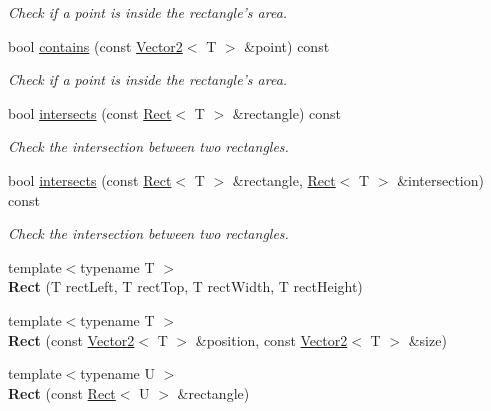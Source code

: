 \begin{DoxyCompactItemize}
\begin{DoxyCompactList}\small\item\em Check if a point is inside the rectangle's area. \end{DoxyCompactList}\item 
bool \hyperlink{classsf_1_1Rect_a24163acdb9b2987c0ea55c201e270d41}{contains} (const \hyperlink{classsf_1_1Vector2}{Vector2}$<$ T $>$ \&point) const 
\begin{DoxyCompactList}\small\item\em Check if a point is inside the rectangle's area. \end{DoxyCompactList}\item 
bool \hyperlink{classsf_1_1Rect_a566740c8f58e01bb052266f47e7e1011}{intersects} (const \hyperlink{classsf_1_1Rect}{Rect}$<$ T $>$ \&rectangle) const 
\begin{DoxyCompactList}\small\item\em Check the intersection between two rectangles. \end{DoxyCompactList}\item 
bool \hyperlink{classsf_1_1Rect_a5f1874792b04c7e221bb786b31f5836e}{intersects} (const \hyperlink{classsf_1_1Rect}{Rect}$<$ T $>$ \&rectangle, \hyperlink{classsf_1_1Rect}{Rect}$<$ T $>$ \&intersection) const 
\begin{DoxyCompactList}\small\item\em Check the intersection between two rectangles. \end{DoxyCompactList}\item 
\hypertarget{classsf_1_1Rect_a53956cee21c818a3355429e3662fe384}{{\footnotesize template$<$typename T $>$ }\\{\bfseries Rect} (T rect\-Left, T rect\-Top, T rect\-Width, T rect\-Height)}\label{classsf_1_1Rect_a53956cee21c818a3355429e3662fe384}

\item 
\hypertarget{classsf_1_1Rect_a7e0ea3f83003ac89b11fd45d581059cc}{{\footnotesize template$<$typename T $>$ }\\{\bfseries Rect} (const \hyperlink{classsf_1_1Vector2}{Vector2}$<$ T $>$ \&position, const \hyperlink{classsf_1_1Vector2}{Vector2}$<$ T $>$ \&size)}\label{classsf_1_1Rect_a7e0ea3f83003ac89b11fd45d581059cc}

\item 
\hypertarget{classsf_1_1Rect_a6fff2bb7e93677839461a66bc2957de0}{{\footnotesize template$<$typename U $>$ }\\{\bfseries Rect} (const \hyperlink{classsf_1_1Rect}{Rect}$<$ U $>$ \&rectangle)}\label{classsf_1_1Rect_a6fff2bb7e93677839461a66bc2957de0}

\end{DoxyCompactItemize}
